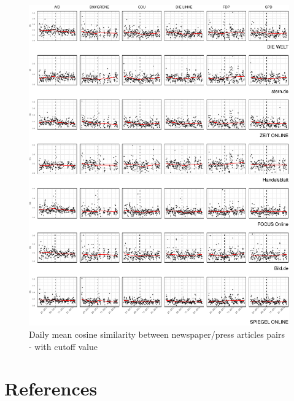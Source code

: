 \documentclass[
  12pt,
]{article}
\begin{document}
\begin{figure}

{\centering \includegraphics[width=1\linewidth]{newspaper_files/figure-latex/Daily mean cosine similarity - cutoff value-1} 

}

\caption{Daily mean cosine similarity between newspaper/press articles pairs - with cutoff value \label{fig:mean_cosine_sim_rd}}\label{fig:Daily mean cosine similarity - cutoff value}
\end{figure}

\newpage

\hypertarget{references}{%
\section*{References}\label{references}}
\end{document}
